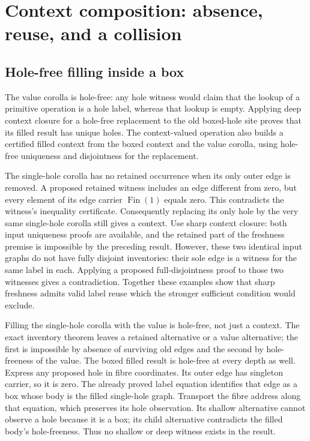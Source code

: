 \section{Context composition: absence, reuse, and a collision}
\subsection{Hole-free filling inside a box}
The value corolla is hole-free: any hole witness would claim that the lookup
of a primitive operation is a hole label, whereas that lookup is empty.
Applying deep context closure for a hole-free replacement to the old boxed-hole
site proves that its filled result has unique holes. The context-valued operation
also builds a certified filled context from the boxed context and the value
corolla, using hole-free uniqueness and disjointness for the replacement.

The single-hole corolla has no retained occurrence when its only outer edge is
removed. A proposed retained witness includes an edge different from zero, but
every element of its edge carrier $\operatorname{Fin}(1)$ equals zero. This
contradicts the witness's inequality certificate.
Consequently replacing its only hole by the very same single-hole corolla still
gives a context. Use sharp context closure: both input uniqueness proofs are
available, and the retained part of the freshness premise is impossible by the
preceding result. However, these two identical input graphs do not have fully
disjoint inventories: their sole edge is a witness for the same label in each.
Applying a proposed full-disjointness proof to those two witnesses gives a
contradiction. Together these examples show that sharp freshness admits valid
label reuse which the stronger sufficient condition would exclude.

Filling the single-hole corolla with the value is hole-free, not just a context.
The exact inventory theorem leaves a retained alternative or a value alternative;
the first is impossible by absence of surviving old edges and the second by
hole-freeness of the value.
The boxed filled result is hole-free at every depth as well. Express any proposed
hole in fibre coordinates. Its outer edge has singleton carrier, so it is zero.
The already proved label equation identifies that edge as a box whose body is
the filled single-hole graph. Transport the fibre address along that equation,
which preserves its hole observation. Its shallow alternative cannot observe a
hole because it is a box; its child alternative contradicts the filled body's
hole-freeness. Thus no shallow or deep witness exists in the result.

